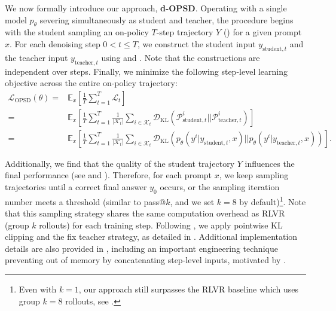 \documentclass{llmxive}
\begin{document}
We now formally introduce our approach, \textbf{d-OPSD}. Operating with a single model $p_\theta$ severing simultaneously as student and teacher, the procedure begins with the student sampling an on-policy $T$-step trajectory $Y$ () for a given prompt $x$. For each denoising step $0 <t \leq T$, we construct the student input $y_{\text{student},t}$ and the teacher input $y_{\text{teacher},t}$ using  and . Note that the constructions are independent over steps. Finally, we minimize the following step-level learning objective across the entire on-policy trajectory:
\begin{equation}
\begin{aligned}
    \mathcal{L}_\text{OPSD} (\theta) =& \mathbb{E}_x \left[ \frac{1}{T} \sum_{t=1}^T \mathcal{L}_t \right] \\
    =& \mathbb{E}_x \left[ \frac{1}{T} \sum_{t=1}^T \frac{1}{|\mathcal{K}_t|}  \sum_{i \in \mathcal{K}_t}  \mathcal{D}_\text{KL} \left(  \mathcal{P}_{\text{student}, t}^i || \mathcal{P}_{\text{teacher}, t}^i \right) \right] \\
    =& \mathbb{E}_x \left[ \frac{1}{T} \sum_{t=1}^T \frac{1}{|\mathcal{K}_t|}  \sum_{i \in \mathcal{K}_t}  \mathcal{D}_\text{KL} \left(  p_\theta \left(y^i|y_{\text{student},t}, x \right) || p_\theta \left(y^i|y_{\text{teacher},t}, x \right) \right) \right].
\end{aligned}
\label{eq12}
\end{equation}

Additionally, we find that the quality of the student trajectory $Y$ influences the final performance (see  and ). Therefore, for each prompt $x$, we keep sampling trajectories until a correct final answer $y_0$ occurs, or the sampling iteration number meets a threshold (similar to pass@$k$, and we set $k=8$ by default)\footnote{Even with $k=1$, our approach still surpasses the RLVR baseline which uses group $k=8$ rollouts, see .}. Note that this sampling strategy shares the same computation overhead as RLVR (group $k$ rollouts) for each training step. Following \citep{zhao2026self}, we apply pointwise KL clipping and the fix teacher strategy, as detailed in . Additional implementation details are also provided in , including an important engineering technique preventing out of memory by concatenating step-level inputs, motivated by \citep{wang2025revolutionizing}.
\end{document}
